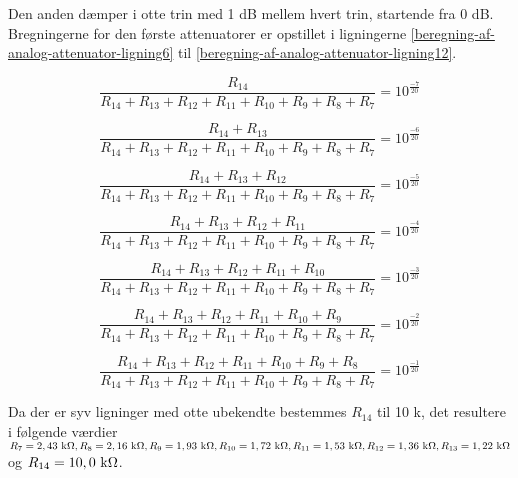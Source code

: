 Den anden dæmper i otte trin med 1 dB mellem hvert trin, startende fra 0 dB. Bregningerne for den første attenuatorer er opstillet i ligningerne \ref{beregning-af-analog-attenuator-ligning6} til \ref{beregning-af-analog-attenuator-ligning12}.

\begin{equation}
\label{beregning-af-analog-attenuator-ligning6}
\frac{R_{14}}{R_{14} + R_{13} + R_{12} + R_{11} + R_{10} + R_{9} + R_{8} + R_{7}} = 10^{\frac{-7}{20}}
\end{equation}

\begin{equation}
\frac{R_{14} + R_{13}}{R_{14} + R_{13} + R_{12} + R_{11} + R_{10} + R_{9} + R_{8} + R_{7}} = 10^{\frac{-6}{20}}
\end{equation}

\begin{equation}
\frac{R_{14} + R_{13} + R_{12}}{R_{14} + R_{13} + R_{12} + R_{11} + R_{10} + R_{9} + R_{8} + R_{7}} = 10^{\frac{-5}{20}}
\end{equation}

\begin{equation}
\frac{R_{14} + R_{13} + R_{12} + R_{11}}{R_{14} + R_{13} + R_{12} + R_{11} + R_{10} + R_{9} + R_{8} + R_{7}} = 10^{\frac{-4}{20}}
\end{equation}

\begin{equation}
\frac{R_{14} + R_{13} + R_{12} + R_{11} + R_{10}}{R_{14} + R_{13} + R_{12} + R_{11} + R_{10} + R_{9} + R_{8} + R_{7}} = 10^{\frac{-3}{20}}
\end{equation}

\begin{equation}
\frac{R_{14} + R_{13} + R_{12} + R_{11} + R_{10} + R_{9}}{R_{14} + R_{13} + R_{12} + R_{11} + R_{10} + R_{9} + R_{8} + R_{7}} = 10^{\frac{-2}{20}}
\end{equation}

\begin{equation}
\label{beregning-af-analog-attenuator-ligning12}
\frac{R_{14} + R_{13} + R_{12} + R_{11} + R_{10} + R_{9} + R_{8}}{R_{14} + R_{13} + R_{12} + R_{11} + R_{10} + R_{9} + R_{8} + R_{7}} = 10^{\frac{-1}{20}}
\end{equation}

Da der er syv ligninger med otte ubekendte bestemmes $R_{14}$ til 10 k\ohm, det resultere i følgende værdier 
$R_{7} = 2,43 ~\mathrm{k}\ohm, R_{8} = 2,16 ~\mathrm{k}\ohm, R_{9} = 1,93 ~\mathrm{k}\ohm, R_{10} = 1,72 ~\mathrm{k}\ohm, R_{11} = 1,53 ~\mathrm{k}\ohm, R_{12} = 1,36 ~\mathrm{k}\ohm, R_{13} = 1,22 ~\mathrm{k}\ohm$ og $R_{14} = 10,0 ~\mathrm{k}\ohm$.